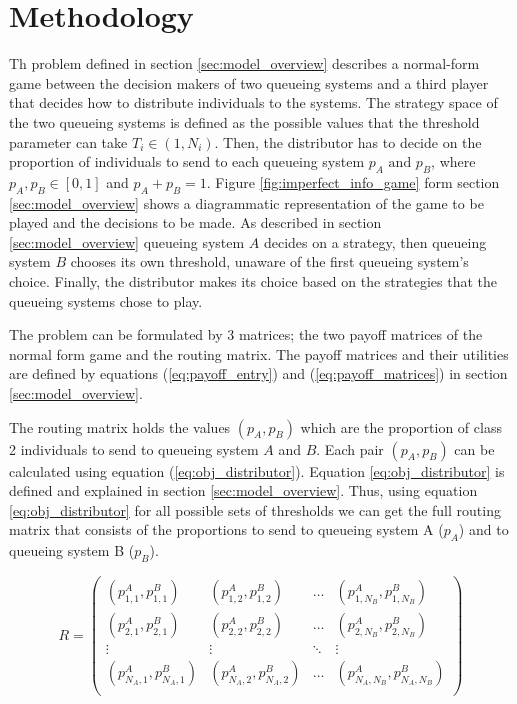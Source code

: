 \section{Methodology}\label{sec:methodology}

Th problem defined in section \ref{sec:model_overview} describes a normal-form
game between the decision makers of two queueing systems and a third player that 
decides how to distribute individuals to the systems.
The strategy space of the two queueing systems is defined as the possible values
that the threshold parameter can take \(T_i \in (1, N_i)\).
Then, the distributor has to decide on the proportion of individuals to send to 
each queueing system \(p_A \text{ and } p_B\), where \(p_A, p_B \in [0, 1] \)
and \(p_A + p_B = 1\).
Figure \ref{fig:imperfect_info_game} form section \ref{sec:model_overview} 
shows a diagrammatic representation of the game to be played and the decisions 
to be made.
As described in section \ref{sec:model_overview} queueing system \(A\) decides
on a strategy, then queueing system \(B\) chooses its own threshold, unaware 
of the first queueing system's choice.
Finally, the distributor makes its choice based on the strategies that the 
queueing systems chose to play. 

The problem can be formulated by 3 matrices; the two payoff matrices of the 
normal form game and the routing matrix.
The payoff matrices and their utilities are defined by equations 
(\ref{eq:payoff_entry}) and (\ref{eq:payoff_matrices}) in section 
\ref{sec:model_overview}.

The routing matrix holds the values \((p_A, p_B)\) which are the proportion 
of class 2 individuals to send to queueing system \(A\) and \(B\).
Each pair \((p_A, p_B)\) can be calculated using equation 
(\ref{eq:obj_distributor}).
Equation \ref{eq:obj_distributor} is defined and explained in section 
\ref{sec:model_overview}.
Thus, using equation \ref{eq:obj_distributor} for all possible sets of 
thresholds we can get the full routing matrix that consists of the proportions
to send to queueing system A (\(p_A\)) and to queueing system B (\(p_B\)).

\begin{equation}\label{eq:routing_matrix}
    R = 
    \begin{pmatrix}
        (p_{1,1}^A, p_{1,1}^B) & (p_{1,2}^A, p_{1,2}^B) & \dots & 
        (p_{1,N_B}^A, p_{1,N_B}^B) \\
        (p_{2,1}^A, p_{2,1}^B) & (p_{2,2}^A, p_{2,2}^B) & \dots & 
        (p_{2,N_B}^A, p_{2,N_B}^B) \\
        \vdots & \vdots & \ddots & \vdots \\
        (p_{N_A,1}^A, p_{N_A,1}^B) & (p_{N_A,2}^A, p_{N_A,2}^B) & \dots & 
        (p_{N_A,N_B}^A, p_{N_A,N_B}^B) \\
    \end{pmatrix}
\end{equation}

